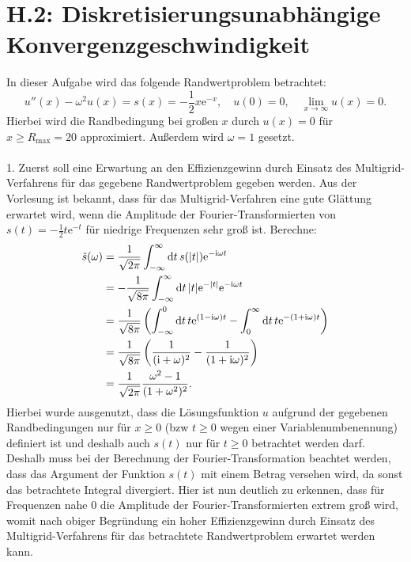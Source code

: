 \documentclass[11pt,a4paper]{article}
\begin{document}
\section*{H.2: Diskretisierungsunabhängige Konvergenzgeschwindigkeit}\label{sec:h2}

In dieser Aufgabe wird das folgende Randwertproblem betrachtet:
\begin{equation*}
    u''(x) - \omega^2 u(x) = s(x) = -\frac{1}{2} x \mathrm{e}^{-x} , \quad u(0) = 0 , \quad \lim_{x \to \infty} u(x) = 0.
\end{equation*} Hierbei wird die Randbedingung bei großen $x$ durch $u(x) = 0$ für $x \geq R_{\mathrm{max}} = 20$ approximiert. Außerdem wird $\omega = 1$ gesetzt.\\ \\
1. Zuerst soll eine Erwartung an den Effizienzgewinn durch Einsatz des Multigrid-Verfahrens für das gegebene Randwertproblem gegeben werden. Aus der Vorlesung ist bekannt, dass für das Multigrid-Verfahren eine gute Glättung erwartet wird, wenn die Amplitude
der Fourier-Transformierten von $s(t) = -\frac{1}{2}t \mathrm{e}^{-t}$ für niedrige Frequenzen sehr groß ist. Berechne:
\begin{align*}
    \tilde{s}(\omega) &= \frac{1}{\sqrt{2\pi}} \int_{-\infty}^{\infty} \dd{t} s(\abs{t}) \mathrm{e}^{-\mathrm{i}\omega t} \\
    &= -\frac{1}{\sqrt{8\pi}} \int_{-\infty}^{\infty} \dd{t} \abs{t} \mathrm{e}^{-\abs{t}} \mathrm{e}^{-\mathrm{i}\omega t} \\
    &= \frac{1}{\sqrt{8\pi}} \left( \int_{-\infty}^{0} \dd{t} t \mathrm{e}^{(1 - \mathrm{i}\omega)t} - \int_{0}^{\infty} \dd{t} t \mathrm{e}^{-(1 + \mathrm{i}\omega)t} \right) \\
    &= \frac{1}{\sqrt{8\pi}} \left( \frac{1}{(\mathrm{i} + \omega)^2} - \frac{1}{(1 + \mathrm{i}\omega)^2}\right) \\
    &= \frac{1}{\sqrt{2\pi}} \frac{\omega^2 - 1}{(1 + \omega^2)^2} .
\end{align*} Hierbei wurde ausgenutzt, dass die Lösungsfunktion $u$ aufgrund der gegebenen Randbedingungen nur für $x \geq 0$ (bzw $t \geq 0$ wegen einer Variablenumbenennung) definiert ist und deshalb auch $s(t)$ nur
für $t \geq 0$ betrachtet werden darf. Deshalb muss bei der Berechnung der Fourier-Transformation beachtet werden, dass das Argument der Funktion $s(t)$ mit einem Betrag versehen wird, da sonst das betrachtete Integral divergiert.
Hier ist nun deutlich zu erkennen, dass für Frequenzen nahe $0$ die Amplitude der Fourier-Transformierten extrem groß wird, womit nach obiger Begründung ein hoher Effizienzgewinn durch Einsatz des Multigrid-Verfahrens für das betrachtete
Randwertproblem erwartet werden kann. \\
\end{document}
